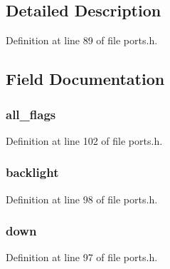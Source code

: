 \subsection{\-Detailed \-Description}


\-Definition at line 89 of file ports.\-h.



\subsection{\-Field \-Documentation}
\hypertarget{unions__button__flags_abf876e68df8575f02084e137cc49266b}{
\subsubsection[{all\-\_\-flags}]{ {\bf all\-\_\-flags}}}\label{unions__button__flags_abf876e68df8575f02084e137cc49266b}


\-Definition at line 102 of file ports.\-h.

\hypertarget{unions__button__flags_a9c01e71f3e1f008f660d67bce0059c11}{
\subsubsection[{backlight}]{ {\bf backlight}}}\label{unions__button__flags_a9c01e71f3e1f008f660d67bce0059c11}


\-Definition at line 98 of file ports.\-h.

\hypertarget{unions__button__flags_add3a702c5221470c92acd98f43495e39}{
\subsubsection[{down}]{ {\bf down}}}\label{unions__button__flags_add3a702c5221470c92acd98f43495e39}


\-Definition at line 97 of file ports.\-h.

